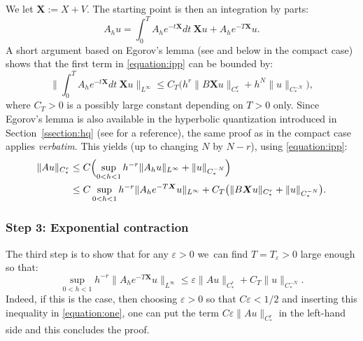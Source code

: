 \documentclass[JEP,XML,SOM,Unicode,NoFloatCountersInSection]{cedram}
\newcommand{\eps}{\varepsilon}
\newcommand{\X}{\boldsymbol{X}}
\theoremstyle{plain}
\theoremstyle{definition}
\begin{document}
We let $\X := X+V$. The starting point is then an integration by parts:
\begin{equation}
\label{equation:ipp}
A_h u = \int_0^T A_h e^{-t\X}dt ~\X u + A_h e^{-T\X}u.
\end{equation}
A short argument based on Egorov's lemma (see \cite[Eq.\,(3.4)]{Bonthonneau-Lefeuvre-21} and below in the compact case) shows that the first term in \eqref{equation:ipp} can be bounded by:
\[
\biggl\|\int_0^T A_h e^{-t\X}dt ~\X u\biggr\|_{L^\infty} \leq C_T \bigl(h^r \|B \X u \|_{C^r_*} + h^N \|u\|_{C^{-N}_*} \bigr),
\]
where $C_T > 0$ is a possibly large constant depending on $T > 0$ only. Since Egorov's lemma is also available in the hyperbolic quantization introduced in Section~\ref{ssection:hq} (see \cite[Th.\,2]{Bonthonneau-16} for a reference), the same proof as in the compact case applies \emph{verbatim}. This yields (up to changing $N$ by $N-r$), using \eqref{equation:ipp}:
\begin{equation}
\label{equation:one}
\begin{split}
\|Au \|_{C^r_*} & \leq C \Bigl(\sup_{0 < h < 1} h^{-r} \|A_h u\|_{L^\infty} + \|u\|_{C^{-N}_*} \Bigr) \\
& \leq C \sup_{0 < h < 1} h^{-r} \|A_h e^{-T\X} u\|_{L^\infty} + C_T \bigl( \|B \X u \|_{C^r_*} + \|u\|_{C^{-N}_*} \bigr).
\end{split}
\end{equation}

\subsubsection*{Step 3: Exponential contraction}
The third step is to show that for any $\eps > 0$ we~can find $T = T_\eps > 0$ large enough so that:
\begin{equation}
\label{equation:contraction}
\sup_{0 < h < 1} h^{-r} \|A_h e^{-T\X}u\|_{L^\infty} \leq \eps \|A u \|_{C^r_*} + C_T \|u\|_{C^{-N}_*}.
\end{equation}
Indeed, if this is the case, then choosing $\eps > 0$ so that $C \eps < 1/2$ and inserting this inequality in \eqref{equation:one}, one can put the term $ C \eps \|A u \|_{C^r_*}$ in the left-hand side and this concludes the proof.
\end{document}
